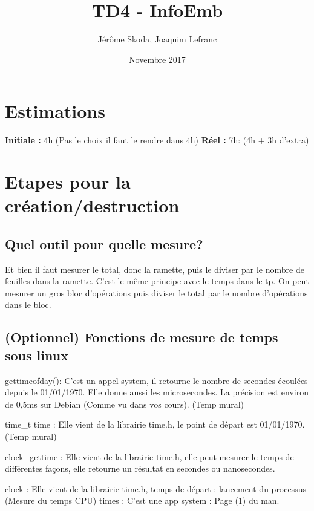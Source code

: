 \documentclass[12pt]{article}
\title{TD4 - InfoEmb}
\author{Jérôme Skoda, Joaquim Lefranc}
\date{Novembre 2017}
\begin{document}
\maketitle

\section{Estimations}
\textbf{Initiale :} 4h (Pas le choix il faut le rendre dans 4h) \newline
\textbf{Réel :} 7h: (4h + 3h d'extra)

\section{Etapes pour la création/destruction}

	\subsection{Quel outil pour quelle mesure?}
		Et bien il faut mesurer le total, donc la ramette, puis le diviser par le nombre de feuilles dans la ramette. C'est le même principe avec le temps dans le tp. On peut mesurer un gros bloc d'opérations puis diviser le total par le nombre d'opérations dans le bloc.

	\subsection{(Optionnel) Fonctions de mesure de temps sous linux}

	gettimeofday(): C'est un appel system, il retourne le nombre de secondes écoulées depuis le 01/01/1970. Elle donne aussi les microsecondes. La précision est environ de 0,5ms sur Debian (Comme vu dans vos cours). (Temp mural)
	\newline

	time\_t time : Elle vient de la librairie time.h, le point de départ est 01/01/1970. (Temp mural)
	\newline

	clock\_gettime : Elle vient de la librairie time.h, elle peut mesurer le temps de différentes façons, elle retourne un résultat en secondes ou nanosecondes.
	\newline

	clock : Elle vient de la librairie time.h, temps de départ : lancement du processus (Mesure du temps CPU)
	\newline
	times : C'est une app system : Page (1) du man.
	\newline
\end{document}
